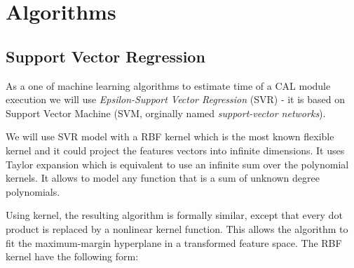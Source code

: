 \section{Algorithms}
\subsection{Support Vector Regression}

As a one of machine learning algorithms to estimate time of a CAL module execution we will use \textit{Epsilon-Support Vector Regression}\cite{svrc} (SVR) - it is based on Support Vector Machine (SVM, orginally named \textit{support-vector networks}\cite{svm}).

We will use SVR model with a RBF kernel\cite{rbf_kernel} which is the most known flexible kernel and it could project the features vectors into infinite dimensions. It uses Taylor expansion which is equivalent to use an infinite sum over the polynomial kernels. It allows to model any function that is a sum of unknown degree polynomials.

Using kernel, the resulting algorithm is formally similar, except that every dot product is replaced by a nonlinear kernel function. This allows the algorithm to fit the maximum-margin hyperplane in a transformed feature space. The RBF kernel have the following form:

